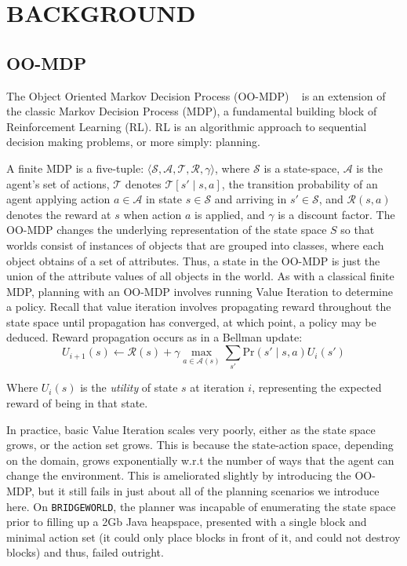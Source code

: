\documentclass[]{article}
\begin{document}
\section{BACKGROUND}

\subsection{OO-MDP}

The Object Oriented Markov Decision Process (OO-MDP) ~\citep{diuk08} is an extension of the classic Markov Decision Process (MDP), a fundamental building block of Reinforcement Learning (RL). RL is an algorithmic approach to sequential decision making problems, or more simply: planning.

A finite MDP is a five-tuple: $\langle \mathcal{S}, \mathcal{A}, \mathcal{T}, \mathcal{R}, \gamma \rangle$, where $\mathcal{S}$ is a state-space, $\mathcal{A}$ is the agent's set of actions, $\mathcal{T}$ denotes $\mathcal{T}[s' \mid s,a]$, the transition probability of an agent applying action $a \in \mathcal{A}$ in state $s \in \mathcal{S}$ and arriving in $s' \in \mathcal{S}$, and $\mathcal{R}(s,a)$ denotes the reward at $s$ when action $a$ is applied, and $\gamma$ is a discount factor. The OO-MDP changes the underlying representation of the state space $S$ so that worlds consist of instances of objects that are grouped into classes, where each object obtains of a set of attributes. Thus, a state in the OO-MDP is just the union of the attribute values of all objects in the world. As with a classical finite MDP, planning with an OO-MDP involves running Value Iteration to determine a policy. Recall that value iteration involves propagating reward throughout the state space until propagation has converged, at which point, a policy may be deduced. Reward propagation occurs as in a Bellman update:
\begin{equation}
U_{i+1}(s) \leftarrow \mathcal{R}(s) + \gamma \max_{a \in \mathcal{A}(s)} \sum_{s'} \text{Pr}(s' \mid s, a)U_i(s')
\end{equation}

Where $U_i(s)$ is the {\it utility} of state $s$ at iteration $i$, representing the expected reward of being in that state.

In practice, basic Value Iteration scales very poorly, either as the state space grows, or the action set grows. This is because the state-action space, depending on the domain, grows exponentially w.r.t the number of ways that the agent can change the environment. This is ameliorated slightly by introducing the OO-MDP, but it still fails in just about all of the planning scenarios we introduce here. On \texttt{BRIDGEWORLD}, the planner was incapable of enumerating the state space prior to filling up a 2Gb Java heapspace, presented with a single block and minimal action set (it could only place blocks in front of it, and could not destroy blocks) and thus, failed outright.
\end{document}
